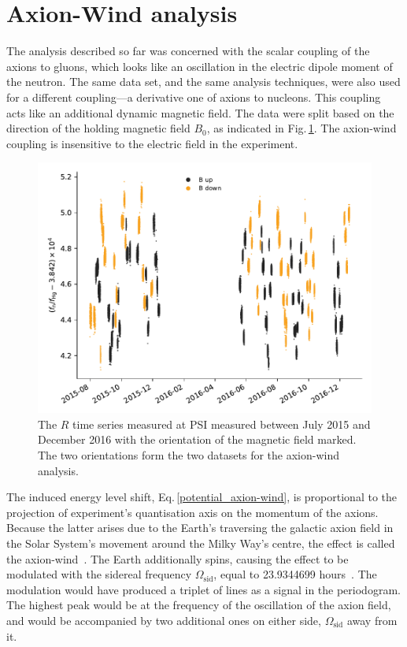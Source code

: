 \section{Axion-Wind analysis}
The analysis described so far was concerned with the scalar coupling of the axions to gluons, which looks like an oscillation in the electric dipole moment of the neutron.
The same data set, and the same analysis techniques, were also used for a different coupling---a derivative one of axions to nucleons. This coupling acts like an additional dynamic magnetic field. The data were split based on the direction of the holding magnetic field $B_0$, as indicated in Fig.\,\ref{fig:axions_wind_time_domain}. The axion-wind coupling is insensitive to the electric field in the experiment.

\begin{figure}
  \centering
  \includegraphics[width=\linewidth]{gfx/axions/wind_winddeltah4mm_time_domain_inset_no_yerr.pdf}
  \caption{The $R$ time series measured at PSI measured between July 2015 and December 2016 with the orientation of the magnetic field marked. The two orientations form the two datasets for the axion-wind analysis.}\label{fig:axions_wind_time_domain}
\end{figure}

The induced energy level shift, Eq.\,\ref{potential_axion-wind}, is proportional to the projection of experiment's quantisation axis on the momentum of the axions.
Because the latter arises due to the Earth's traversing the galactic axion field in the Solar System's movement around the Milky Way's centre, the effect is called the axion-wind~\cite{Stadnik2014A}.
The Earth additionally spins, causing the effect to be modulated with the sidereal frequency $\Omega_\text{sid}$, equal to \num[detect-all=true]{23.9344699} hours~\cite{AstronomicalAlmanac}.
The modulation would have produced a triplet of lines as a signal in the periodogram.
The highest peak would be at the frequency of the oscillation of the axion field, and would be accompanied by two additional ones on either side, $\Omega_\text{sid}$ away from it.

